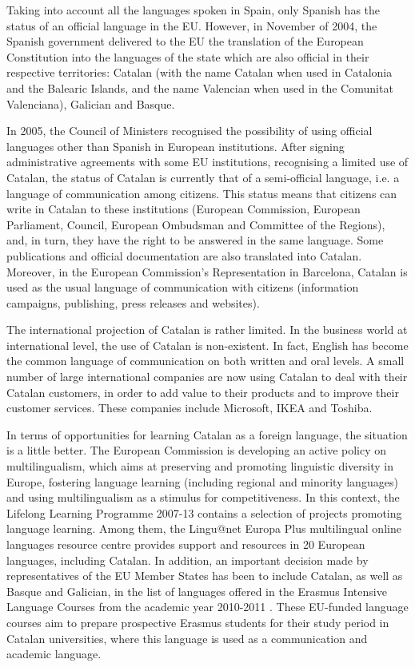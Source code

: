 \begin{multicols}{2}
Taking into account all the languages spoken in Spain, only Spanish has the status of an official language in the EU.  However, in November of 2004, the Spanish government delivered to the EU the translation of the European Constitution into the languages of the state which are also official in their respective territories: Catalan (with the name Catalan when used in Catalonia and the Balearic Islands, and the name Valencian when used in the Comunitat Valenciana), Galician and Basque. 

In 2005, the Council of Ministers recognised the possibility of using official languages other than Spanish in European institutions. After signing administrative agreements with some EU institutions, recognising a limited use of Catalan, the status of Catalan is currently that of a semi-official language, i.e. a language of communication among citizens. This status means that citizens can write in Catalan to these institutions (European Commission, European Parliament, Council, European Ombudsman and Committee of the Regions), and, in turn, they have the right to be answered in the same language. Some publications and official documentation are also translated into Catalan. Moreover, in the European Commission’s Representation in Barcelona, Catalan is used as the usual language of communication with citizens (information campaigns, publishing, press releases and websites).

The international projection of Catalan is rather limited. In the business world at international level, the use of Catalan is non-existent. In fact, English has become the common language of communication on both written and oral levels. A small number of large international companies are now using Catalan to deal with their Catalan customers, in order to add value to their products and to improve their customer services. These companies include Microsoft, IKEA and Toshiba.

In terms of opportunities for learning Catalan as a foreign language, the situation is a little better. The European Commission is developing an active policy on multilingualism, which aims at preserving and promoting linguistic diversity in Europe, fostering language learning (including regional and minority languages) and using multilingualism as a stimulus for competitiveness. In this context, the Lifelong Learning Programme 2007-13 contains a selection of projects promoting language learning. Among them, the Lingu@net Europa Plus multilingual online languages resource centre \cite{CAT-Nota9} provides support and resources in 20 European languages, including Catalan. In addition, an important decision made by representatives of the EU Member States has been to include Catalan, as well as Basque and Galician, in the list of languages offered in the Erasmus Intensive Language Courses from the academic year 2010-2011 \cite{CAT-Nota10}. These EU-funded language courses aim to prepare prospective Erasmus students for their study period in Catalan universities, where this language is used as a communication and academic language.


\end{multicols}
